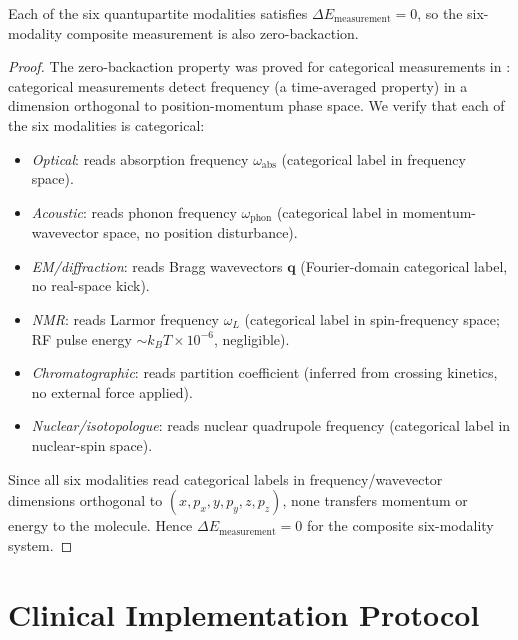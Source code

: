 \begin{theorem}
\label{thm:ch04-six-modality-zero-backaction}
Each of the six quantupartite modalities satisfies
$\Delta E_{\mathrm{measurement}} = 0$, so the six-modality composite
measurement is also zero-backaction.
\end{theorem}

\begin{proof}
The zero-backaction property was proved for categorical measurements in
: categorical measurements detect frequency
(a time-averaged property) in a dimension orthogonal to position-momentum
phase space.  We verify that each of the six modalities is categorical:

\begin{itemize}[noitemsep]
    \item \emph{Optical}: reads absorption frequency $\omega_{\mathrm{abs}}$
          (categorical label in frequency space).
    \item \emph{Acoustic}: reads phonon frequency $\omega_{\mathrm{phon}}$
          (categorical label in momentum-wavevector space, no position
          disturbance).
    \item \emph{EM/diffraction}: reads Bragg wavevectors $\mathbf{q}$
          (Fourier-domain categorical label, no real-space kick).
    \item \emph{NMR}: reads Larmor frequency $\omega_L$ (categorical label
          in spin-frequency space; RF pulse energy $\sim k_B T \times 10^{-6}$,
          negligible).
    \item \emph{Chromatographic}: reads partition coefficient (inferred from
          crossing kinetics, no external force applied).
    \item \emph{Nuclear/isotopologue}: reads nuclear quadrupole frequency
          (categorical label in nuclear-spin space).
\end{itemize}
Since all six modalities read categorical labels in frequency/wavevector
dimensions orthogonal to $(x, p_x, y, p_y, z, p_z)$, none transfers
momentum or energy to the molecule.  Hence
$\Delta E_{\mathrm{measurement}} = 0$ for the composite six-modality system.
\end{proof}

\section{Clinical Implementation Protocol}
\label{sec:ch04-clinical-implementation}

